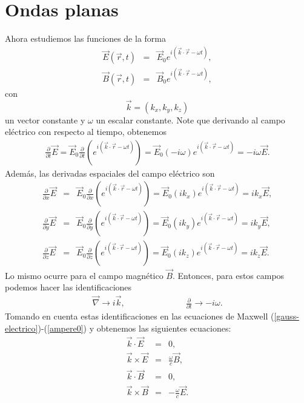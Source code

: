 \documentclass[letterpaper,12pt,oneside]{book}
\begin{document}
\section{Ondas planas}


\label{ondaplan}

Ahora estudiemos las funciones de la forma
%
\begin{eqnarray}
\vec E(\vec r,t)&=&\vec E_{0}e^{i(\vec k \cdot\vec  r - \omega t)}\label{solnE}, \\
\vec B(\vec r,t)&=&\vec B_{0}e^{i(\vec k \cdot\vec  r - \omega t)}\label{solnB},
\end{eqnarray}
%
con 
%
$$\vec k=(k_{x},k_{y},k_{z})$$
%
 un vector constante y $\omega$ un escalar constante. Note que derivando al campo el\'ectrico con 
respecto al tiempo, obtenemos
%
\begin{eqnarray}
\frac{\partial}{\partial t}\vec E = \vec E_0\frac{\partial}{\partial t}\left( e^{i(\vec k \cdot \vec r - \omega t)}\right)= \vec E_{0} (-i\omega)e^{i(\vec k \cdot \vec r - \omega t)}=-i\omega \vec E.
\end{eqnarray}
%
Adem\'as,  las derivadas espaciales  del campo el\'ectrico son 
%
\begin{eqnarray}
\frac{\partial}{\partial x}\vec E &=& \vec E_0\frac{\partial}{\partial x}\left(e^{i(\vec k \cdot \vec r - \omega t)} \right)= \vec E_{0} (ik_{x})e^{i(\vec k \cdot \vec r - \omega t)}=i k_{x} \vec E,\\
\frac{\partial}{\partial y}\vec E &=& \vec E_0\frac{\partial}{\partial y}\left (e^{i(\vec k \cdot \vec r - \omega t)} \right)= \vec E_{0} (ik_{y})e^{i(\vec k \cdot \vec r - \omega t)}=i k_{y} \vec E,\\
\frac{\partial}{\partial z}\vec E &=& \vec E_0\frac{\partial}{\partial z} \left(e^{i(\vec k \cdot \vec r - \omega t)}\right)= \vec E_{0} (ik_{z})e^{i(\vec k \cdot \vec r - \omega t)}=i k_{z} \vec E.
\end{eqnarray}
%
Lo mismo ocurre para el campo magn\'etico $\vec B.$ Entonces, para estos campos podemos hacer las identificaciones 
%
\begin{eqnarray}
\vec \nabla \longrightarrow i\vec k, \hspace{3cm} \frac{\partial}{\partial t} \longrightarrow -i\omega.
\end{eqnarray}
%
Tomando en cuenta estas identificaciones en las ecuaciones de Maxwell (\ref{gauss-electrico})-(\ref{ampere0}) y obtenemos las siguientes ecuaciones:
%
\begin{eqnarray}
\vec k\cdot \vec E &=& 0\label{perpenE},\\
\vec k\times \vec E &=& \frac{\omega}{c}\vec B\label{perpenxE},\\
\vec k\cdot \vec B &=& 0\label{perpenb},\\
\vec k\times \vec B &=& -\frac{\omega}{c}\vec E\label{perpenxB}.
\end{eqnarray}
\end{document}
